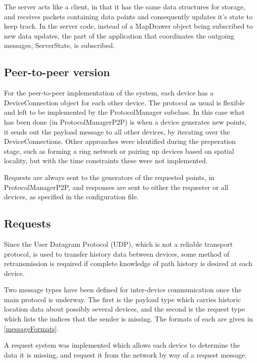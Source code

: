 The server acts like a client, in that it has the same data structures for storage, and receives packets containing data points and consequently updates it's state to keep track. In the server code, instead of a MapDrawer object being subscribed to new data updates, the part of the application that coordinates the outgoing messages, ServerState, is subscribed.

\subsection{Peer-to-peer version}

For the peer-to-peer implementation of the system, each device has a DeviceConnection object for each other device. The protocol as usual is flexible and left to be implemented by the ProtocolManager subclass. In this case what has been done (in ProtocolManagerP2P) is when a device generates new points, it sends out the payload message to all other devices, by iterating over the DeviceConnections. Other approaches were identified during the preperation stage, such as forming a ring network or pairing up devices based on spatial locality, but with the time constraints these were not implemented.

Requests are always sent to the generators of the requested points, in ProtocolManagerP2P, and responses are sent to either the requester or all devices, as specified in the configuration file.

\subsection{Requests}

Since the User Datagram Protocol (UDP), which is not a reliable transport protocol, is used to transfer history data between devices, some method of retransmission is required if complete knowledge of path history is desired at each device.

Two message types have been defined for inter-device communication once the main protocol is underway. The first is the payload type which carries historic location data about possibly several devices, and the second is the request type which lists the indices that the sender is missing. The formats of each are given in \ref{messageFormats}.

A request system was implemented which allows each device to determine the data it is missing, and request it from the network by way of a request message.

